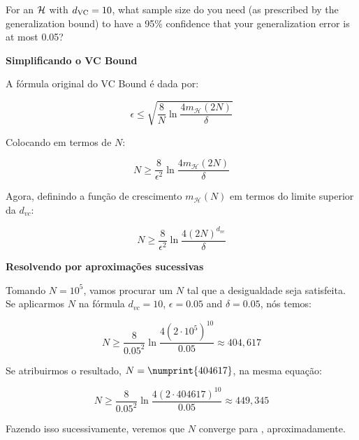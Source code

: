 \begin{enunciado}{12}
    For an $\mathcal{H}$ with $d_{\text{VC}} = 10$, what sample size
    do you need (as prescribed by the generalization bound) to have a 95\% confidence that your generalization error is at most 0.05?
\end{enunciado}

\textbf{Simplificando o  VC Bound}

A fórmula original do VC Bound é dada por:

\begin{equation*}
\epsilon \leq \sqrt{\frac{8}{N}\ln{\frac{4m_{\mathcal{H}}(2N)}{\delta}}}
\end{equation*}

Colocando em termos de $N$:

\begin{equation*}
N \geq \frac{8}{\epsilon^2}\ln{\frac{4m_{\mathcal{H}}(2N)}{\delta}}
\end{equation*}

Agora, definindo a função de crescimento $m_{\mathcal{H}}(N)$ em termos do limite superior da $d_{vc}$:

\begin{equation*}
N \geq \frac{8}{\epsilon^2}\ln{\frac{4(2N)^{d_{vc}}}{\delta}}
\end{equation*}

\textbf{Resolvendo por aproximações sucessivas}

Tomando $N=10^5$, vamos procurar um $N$ tal que a desigualdade seja satisfeita.
Se aplicarmos $N$ na fórmula $d_{vc}=10$,
$\epsilon=0.05$ and $\delta=0.05$, nós temos:

\begin{equation*}
N \geq \frac{8}{0.05^2}\ln{\frac{4(2\cdot10^5)^{10}}{0.05}} \approx 404,617
\end{equation*}

Se atribuirmos o resultado, $N=\numprint{404617}$, na mesma equação:

\begin{equation*}
N \geq \frac{8}{0.05^2}\ln{\frac{4(2\cdot404617)^{10}}{0.05}} \approx 449,345
\end{equation*}

Fazendo isso sucessivamente, veremos que $N$ converge para , aproximadamente.